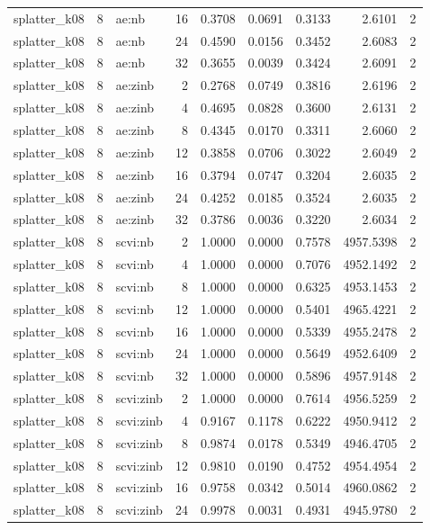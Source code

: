 \begin{tabular}{lrlrrrrrr}
splatter\_k08 & 8 & ae:nb & 16 & 0.3708 & 0.0691 & 0.3133 & 2.6101 & 2 \\
splatter\_k08 & 8 & ae:nb & 24 & 0.4590 & 0.0156 & 0.3452 & 2.6083 & 2 \\
splatter\_k08 & 8 & ae:nb & 32 & 0.3655 & 0.0039 & 0.3424 & 2.6091 & 2 \\
splatter\_k08 & 8 & ae:zinb & 2 & 0.2768 & 0.0749 & 0.3816 & 2.6196 & 2 \\
splatter\_k08 & 8 & ae:zinb & 4 & 0.4695 & 0.0828 & 0.3600 & 2.6131 & 2 \\
splatter\_k08 & 8 & ae:zinb & 8 & 0.4345 & 0.0170 & 0.3311 & 2.6060 & 2 \\
splatter\_k08 & 8 & ae:zinb & 12 & 0.3858 & 0.0706 & 0.3022 & 2.6049 & 2 \\
splatter\_k08 & 8 & ae:zinb & 16 & 0.3794 & 0.0747 & 0.3204 & 2.6035 & 2 \\
splatter\_k08 & 8 & ae:zinb & 24 & 0.4252 & 0.0185 & 0.3524 & 2.6035 & 2 \\
splatter\_k08 & 8 & ae:zinb & 32 & 0.3786 & 0.0036 & 0.3220 & 2.6034 & 2 \\
splatter\_k08 & 8 & scvi:nb & 2 & 1.0000 & 0.0000 & 0.7578 & 4957.5398 & 2 \\
splatter\_k08 & 8 & scvi:nb & 4 & 1.0000 & 0.0000 & 0.7076 & 4952.1492 & 2 \\
splatter\_k08 & 8 & scvi:nb & 8 & 1.0000 & 0.0000 & 0.6325 & 4953.1453 & 2 \\
splatter\_k08 & 8 & scvi:nb & 12 & 1.0000 & 0.0000 & 0.5401 & 4965.4221 & 2 \\
splatter\_k08 & 8 & scvi:nb & 16 & 1.0000 & 0.0000 & 0.5339 & 4955.2478 & 2 \\
splatter\_k08 & 8 & scvi:nb & 24 & 1.0000 & 0.0000 & 0.5649 & 4952.6409 & 2 \\
splatter\_k08 & 8 & scvi:nb & 32 & 1.0000 & 0.0000 & 0.5896 & 4957.9148 & 2 \\
splatter\_k08 & 8 & scvi:zinb & 2 & 1.0000 & 0.0000 & 0.7614 & 4956.5259 & 2 \\
splatter\_k08 & 8 & scvi:zinb & 4 & 0.9167 & 0.1178 & 0.6222 & 4950.9412 & 2 \\
splatter\_k08 & 8 & scvi:zinb & 8 & 0.9874 & 0.0178 & 0.5349 & 4946.4705 & 2 \\
splatter\_k08 & 8 & scvi:zinb & 12 & 0.9810 & 0.0190 & 0.4752 & 4954.4954 & 2 \\
splatter\_k08 & 8 & scvi:zinb & 16 & 0.9758 & 0.0342 & 0.5014 & 4960.0862 & 2 \\
splatter\_k08 & 8 & scvi:zinb & 24 & 0.9978 & 0.0031 & 0.4931 & 4945.9780 & 2 \\

\end{tabular}
